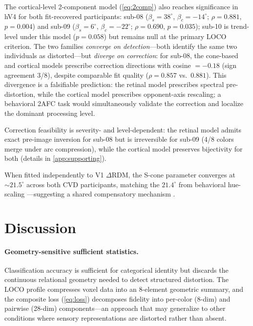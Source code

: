 \documentclass{article}
\begin{document}
The cortical-level 2-component model (\cref{eq:2comp}) also reaches significance in hV4 for both fit-recovered participants: sub-08 ($\beta_s = 38^\circ$, $\beta_c = -14^\circ$; $\rho = 0.881$, $p = 0.004$) and sub-09 ($\beta_s = 6^\circ$, $\beta_c = -22^\circ$; $\rho = 0.690$, $p = 0.035$); sub-10 is trend-level under this model ($p = 0.058$) but remains null at the primary LOCO criterion.
The two families \emph{converge on detection}---both identify the same two individuals as distorted---but \emph{diverge on correction}: for sub-08, the cone-based and cortical models prescribe correction directions with cosine $= -0.18$ (sign agreement 3/8), despite comparable fit quality ($\rho = 0.857$ vs.\ $0.881$).
This divergence is a falsifiable prediction: the retinal model prescribes spectral pre-distortion, while the cortical model prescribes opponent-axis rescaling; a behavioral 2AFC task would simultaneously validate the correction and localize the dominant processing level.

Correction feasibility is severity- and level-dependent: the retinal model admits exact pre-image inversion for sub-08 but is irreversible for sub-09 (4/8 colors merge under arc compression), while the cortical model preserves bijectivity for both (details in \cref{app:supporting}).

When fitted independently to V1 $\Delta$RDM, the S-cone parameter converges at ${\sim}21.5^\circ$ across both CVD participants, matching the $21.4^\circ$ from behavioral hue-scaling \citep{emery2021}---suggesting a shared compensatory mechanism \citep{tregillus2021, boehm2014}.

\section{Discussion}
\label{sec:discussion}

\paragraph{Geometry-sensitive sufficient statistics.}
Classification accuracy is sufficient for categorical identity but discards the continuous relational geometry needed to detect structured distortion.
The LOCO profile compresses voxel data into an 8-element geometric summary, and the composite loss (\cref{eq:loss}) decomposes fidelity into per-color (8-dim) and pairwise (28-dim) components---an approach that may generalize to other conditions where sensory representations are distorted rather than absent.
\end{document}
